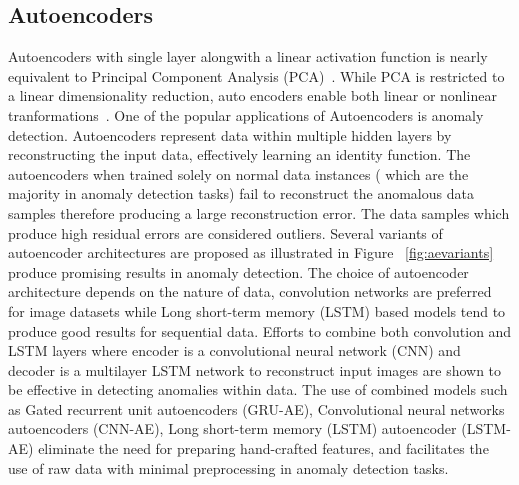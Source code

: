 \subsection{Autoencoders}
\label{sec:ae}
Autoencoders with single layer alongwith a linear activation function is nearly equivalent to Principal Component Analysis (PCA)~\cite{pearson1901liii}. While PCA is restricted to a linear dimensionality reduction, auto encoders enable both linear or nonlinear tranformations~\cite{liou2008modeling,liou2014autoencoder}. One of the popular applications of Autoencoders is anomaly detection. Autoencoders represent data within multiple hidden layers by reconstructing the input data, effectively learning an identity function. The autoencoders when trained solely on normal data instances ( which are the majority in anomaly detection tasks) fail to reconstruct the anomalous data samples therefore producing a large reconstruction error. The data samples which produce high residual errors are considered outliers. Several variants of autoencoder architectures are proposed as illustrated in Figure ~\ref{fig:aevariants} produce promising results in anomaly detection. The choice of autoencoder architecture depends on the nature of data, convolution networks are preferred for image datasets while Long short-term memory (LSTM) based models tend to produce good results for sequential data. Efforts to combine both convolution and LSTM layers where encoder is a convolutional neural network (CNN) and decoder is a multilayer LSTM network to reconstruct  input images are shown to be effective in detecting anomalies within data.  The use of combined models  such as Gated recurrent unit autoencoders (GRU-AE), Convolutional neural networks autoencoders (CNN-AE), Long short-term memory (LSTM) autoencoder (LSTM-AE) eliminate the need for preparing hand-crafted features,  and facilitates the use of raw data with minimal preprocessing in anomaly detection tasks.



